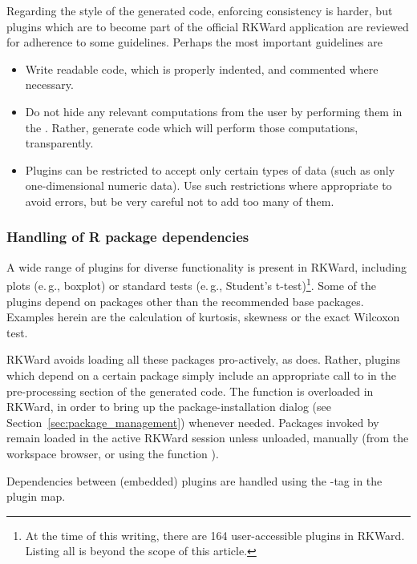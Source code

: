 Regarding the style of the generated  code, enforcing consistency is harder,
but plugins which are to become part of the official RKWard application are
reviewed for adherence to some guidelines. Perhaps the most important guidelines
are 

\begin{itemize}
  \item 
  Write readable code, which is properly indented, and commented where necessary.

  \item 
  Do not hide any relevant computations from the user by performing them in the
  . Rather, generate  code which will perform
  those computations, transparently.

  \item
  Plugins can be restricted to accept only certain types of data (such as only one-dimensional numeric data).
  Use such restrictions where appropriate to avoid errors, but be very careful not to add
  too many of them.
\end{itemize}

\subsubsection{Handling of R package dependencies}
\label{sec:technical_plugins_dependencies}
A wide range of plugins for diverse functionality is present in RKWard,
including plots (e.\,g., boxplot) or standard tests (e.\,g., Student's t-test)\footnote{
  At the time of this writing, there are 164 user-accessible plugins in RKWard.
  Listing all is beyond the scope of this article.
}. Some
of the plugins depend on  packages other than the recommended  base packages.
Examples herein are the calculation of kurtosis, skewness or the exact Wilcoxon
test.

RKWard avoids loading all these packages pro-actively, as  does. Rather,
plugins which depend on a certain package simply include an appropriate call to
 in the pre-processing section of the generated  code. The 
function is overloaded in RKWard, in order to bring up the package-installation
dialog (see Section~\ref{sec:package_management}) whenever needed. Packages invoked by  remain loaded
in the active RKWard session unless unloaded, manually (from the workspace browser, or using the
 function ).

Dependencies between (embedded) plugins are handled using the -tag in the plugin map.

